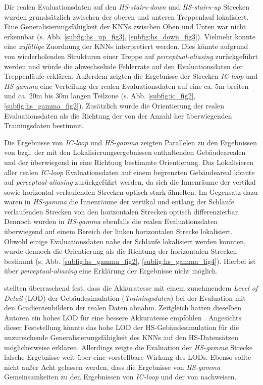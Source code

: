 Die realen Evaluationsdaten auf den \textit{HS-stairs-down} und \textit{HS-stairs-up} Strecken wurden grundsätzlich zwischen der oberen und unteren Treppenlauf lokalisiert. Eine Generalisierungsfähigkeit der KNNs zwischen Oben und Unten war nicht erkennbar (s. Abb. \ref{subfig:hs_up_fig3}, \ref{subfig:hs_down_fig3}). Vielmehr konnte eine \textit{zufällige} Zuordnung der KNNs interpretiert werden. Dies könnte aufgrund von wiederholenden Strukturen einer Treppe auf \textit{perceptual-aliasing} zurückgeführt werden und würde die abwechselnde Fehlerrate auf den Evaluationsdaten der Treppenläufe erklären. Außerdem zeigten die Ergebnisse der Strecken \textit{IC-loop} und \textit{HS-gamma} eine Verteilung der realen Evaluationsdaten auf eine ca. 5m breiten und ca. 20m bis 30m langen Teilzone (s. Abb. \ref{subfig:ic_fig2}, \ref{subfig:hs_gamma_fig2}). Zusätzlich wurde die Orientierung der realen Evaluationsdaten als die Richtung der von der Anzahl her überwiegenden Trainingsdaten bestimmt.


Die Ergebnisse von \textit{IC-loop} und \textit{HS-gamma} zeigten Parallelen zu den Ergebnissen von \citet{acharyaBIMPoseNetIndoorCamera2019} bzgl. der mit den Lokalisierungsergebnissen enthaltenden Gebäudearealen und 
der überwiegend in eine Richtung bestimmte Orientierung.
Das Lokalisieren aller realen \textit{IC-loop} Evaluationsdaten auf einem begrenzten Gebäudeareal könnte auf \textit{perceptual-aliasing} zurückgeführt werden, da sich die Innenräume der vertikal sowie horizontal verlaufenden Strecken optisch stark ähnelten. Im Gegensatz dazu waren in \textit{HS-gamma} die Innenräume der vertikal und entlang der Schlaufe verlaufenden Strecken von den horizontalen Strecken optisch differenzierbar. Dennoch wurden in \textit{HS-gamma} ebenfalls die realen Evaluationsdaten überwiegend auf einem Bereich der linken horizontalen Strecke lokalisiert. Obwohl einige Evaluationsdaten nahe der Schlaufe lokalisiert werden konnten, wurde dennoch die Orientierung als die Richtung der horizontalen Strecken bestimmt (s. Abb. \ref{subfig:hs_gamma_fig2}, \ref{subfig:hs_gamma_fig4}). Hierbei ist über \textit{perceptual-aliasing} eine Erklärung der Ergebnisse nicht möglich.

\citet{acharyaBIMPoseNetIndoorCamera2019} stellten überraschend fest, dass die Akkuratesse mit einem zunehmendem \textit{Level of Detail} (LOD) der Gebäudesimulation (\textit{Trainingsdaten}) bei der Evaluation mit den Gradientenbildern der realen Daten abnahm. Zeitgleich hatten dieselben Autoren ein hohes LOD für eine bessere Akkuratesse empfohlen \cite{acharyaBIMPoseNetIndoorCamera2019}. Angesichts dieser Feststellung könnte das hohe LOD der HS-Gebäudesimulation für die unzureichende Generalisierungsfähigkeit des KNNs auf den HS-Datensätzen möglicherweise erklären. Allerdings zeigte die Evaluation der \textit{HS-gamma} Strecke falsche Ergebnisse weit über eine vorstellbare Wirkung des LODs. Ebenso sollte nicht außer Acht gelassen werden, dass die Ergebnisse von \textit{HS-gamma} Gemeinsamkeiten zu den Ergebnissen von \textit{IC-loop} und der von \citet{acharyaBIMPoseNetIndoorCamera2019} nachweisen.

